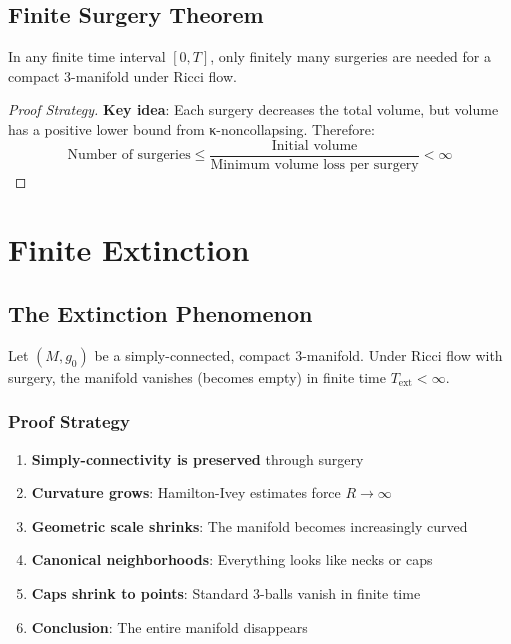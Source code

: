 \section{Finite Surgery Theorem}

\begin{theorem}
\label{thm:finite_surgery}
\leanok
{}
In any finite time interval $[0, T]$, only finitely many surgeries are needed for a compact 3-manifold under Ricci flow.
\end{theorem}

\begin{proof}[Proof Strategy]
\textbf{Key idea}: Each surgery decreases the total volume, but volume has a positive lower bound from κ-noncollapsing. Therefore:
\[
\text{Number of surgeries} \leq \frac{\text{Initial volume}}{\text{Minimum volume loss per surgery}} < \infty
\]
\end{proof}

\chapter{Finite Extinction}
\label{chap:extinction}

\section{The Extinction Phenomenon}

\begin{theorem}
\label{thm:finite_extinction}
\leanok
{}
Let $(M, g_0)$ be a simply-connected, compact 3-manifold. Under Ricci flow with surgery, the manifold vanishes (becomes empty) in finite time $T_{\text{ext}} < \infty$.
\end{theorem}

\subsection{Proof Strategy}

\begin{enumerate}
\item \textbf{Simply-connectivity is preserved} through surgery
\item \textbf{Curvature grows}: Hamilton-Ivey estimates force $R \to \infty$
\item \textbf{Geometric scale shrinks}: The manifold becomes increasingly curved
\item \textbf{Canonical neighborhoods}: Everything looks like necks or caps
\item \textbf{Caps shrink to points}: Standard 3-balls vanish in finite time
\item \textbf{Conclusion}: The entire manifold disappears
\end{enumerate}

